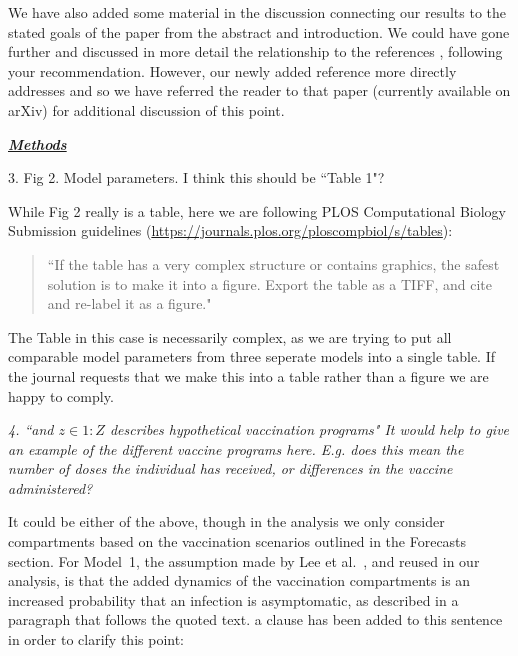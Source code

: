 \documentclass[11pt]{article}
\newcommand\report[1]{{\color{mygreen} \vspace{1mm}\hspace{0.25in}\parbox{6in}{\em #1}}}
\newcommand\article[1]{{\color{blue} \vspace{1mm}\hspace{0.25in}\parbox{6in}{\em #1}}}
\begin{document}

\article{\editModelingGuidance}


We have also added some material in the discussion connecting our results to the stated goals of the paper from the abstract and introduction.
We could have gone further and discussed in more detail the relationship to the references \cite{behrend20,saltelli20}, following your recommendation.
However, our newly added reference \cite{li23} more directly addresses \cite{behrend20,saltelli20} and so we have referred the reader to that paper (currently available on arXiv) for additional discussion of this point.

\report{
  \textbf{\underline{Methods}}

3.  Fig 2. Model parameters. I think this should be ``Table 1"?
}

While Fig 2 really is a table, here we are following PLOS Computational Biology Submission guidelines (\url{https://journals.plos.org/ploscompbiol/s/tables}):
\begin{quote}
``If the table has a very complex structure or contains graphics, the safest solution is to make it into a figure. Export the table as a TIFF, and cite and re-label it as a figure."
\end{quote}
The Table in this case is necessarily complex, as we are trying to put all comparable model parameters from three seperate models into a single table.
If the journal requests that we make this into a table rather than a figure we are happy to comply.

\report{4.
    ``and $z \in 1:Z$ describes hypothetical vaccination programs" It would help to give an example of the different vaccine programs here. E.g. does this mean the number of doses the individual has received, or differences in the vaccine administered?
}

It could be either of the above, though in the analysis we only consider compartments based on the vaccination scenarios outlined in the Forecasts section.
For Model~1, the assumption made by Lee et al.~\cite{lee20}, and reused in our analysis, is that the added dynamics of the vaccination compartments is an increased probability that an infection is asymptomatic, as described in a paragraph that follows the quoted text.
a clause has been added to this sentence in order to clarify this point:
\end{document}
